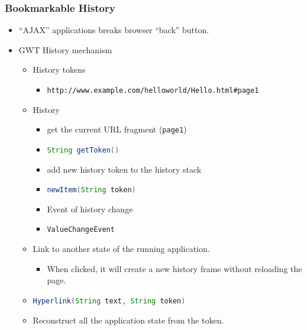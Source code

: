 \documentclass[10pt,table, xcolor=pdflatex]{beamer}
\newcommand{\inlinejava}{\lstinline[language={Java}]}
\begin{document}
\begin{frame}[fragile]\frametitle{Bookmarkable History}
	\begin{itemize}
		\item ``AJAX'' applications breaks browser ``back'' button.
        \item GWT History mechanism
          \begin{itemize}
            \item History tokens
              \begin{itemize}
            	\item \verb'http://www.example.com/helloworld/Hello.html#page1'
              \end{itemize}
            \item History
              \begin{itemize}
                \item get the current URL fragment (\texttt{page1})
                \item[] \inlinejava{String getToken()}\\[0.3em]
                \item add new history token to the history stack
                \item[] \inlinejava{newItem(String token)}\\[0.3em]
                \item Event of history change
                \item[] \inlinejava{ValueChangeEvent}   
              \end{itemize}
            \item Link to another state of the running application. 
              \begin{itemize}
                \item When clicked, it will create a new history frame without reloading the page.
              \end{itemize}
            \item[] \inlinejava{Hyperlink(String text, String token)}\\[0.3em]
            \item Reconstruct all the application state from the token.
          \end{itemize}
	\end{itemize}
\end{frame}
\end{document}
